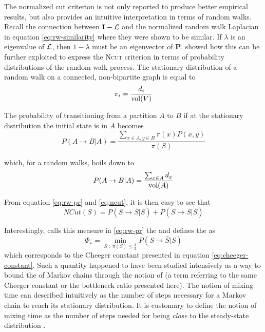 The normalized cut criterion is not only reported to produce better empirical results, but also
provides an intuitive interpretation in terms of random walks. Recall the connection
between $\mathbf{I} - \mathbf{\mathcal{L}}$ and the normalized random walk Laplacian in
equation \ref{eq:rw-similarity} where they were shown to be similar. If
$\lambda$ is an eigenvalue of $\mathbf{\mathcal{L}}$, then $1 - \lambda$ must be an eigenvector
of $\mathbf{P}$. \cite{Shi2001} showed how this can be further exploited to express the \textsc{Ncut}
criterion in terms of probability distributions of the random walk process. The stationary distribution of a random walk on a connected, non-bipartite graph is equal to  \parencite{Levin2008} 
\begin{equation}
\pi_i = \frac{d_i}{\operatorname{\text{vol}}(V)}
\end{equation}

The probability of transitioning from a partition $A$ to $B$ if at the stationary distribution the initial state is in $A$ becomes
\begin{equation}
P(A \to B | A) = \frac{\sum_{x \in A, y \in B} \pi(x) P(x, y)}{\pi(S)}
\label{eq:rw-pr}
\end{equation}

which, for a random walks, boils down to 
\begin{equation}
P(A \to B | A) = \frac{\sum_{x \in A} d_x}{\operatorname{\text{vol}}(A)}
\end{equation}

From equation \ref{eq:rw-pr} and \ref{eq:ncut}, it is then easy to see that
\begin{equation}
NCut(S) = P(S \to \bar{S} | S) + P(\bar{S} \to S | \bar{S})
\end{equation}

Interestingly, \cite{Levin2008} calls this measure in \ref{eq:rw-pr} the
 and defines the 
as 
\begin{equation}
\Phi_\star = \min_{S\; : \;\pi(S) \leq \frac{1}{2}} P(S \to \bar{S} | S)
\end{equation}
which corresponds to the Cheeger constant presented in equation 
\ref{eq:cheeger-constant}. Such a quantity happened to have been studied intensively as
a way to bound the  of Markov chains through the notion of
 (a term referring to the same Cheeger constant or the bottleneck
ratio presented here). The notion of mixing time can described intuitively as the number
of steps necessary for a Markov chain to reach its stationary distribution. It is customary to define the notion of mixing time as the number of steps needed for being \textit{close} to the steady-state distribution \parencite{Jerrum1988}.

